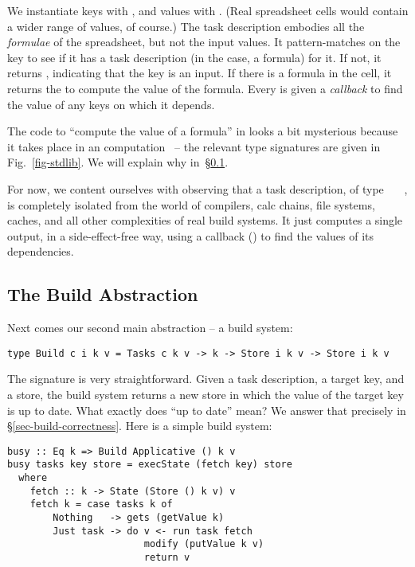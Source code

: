 \noindent
We instantiate keys  with , and values  with .
(Real spreadsheet cells would contain a wider range of values, of course.) The
task description  embodies all the \emph{formulae} of the spreadsheet,
but not the input values. It pattern-matches on the key to see if it has a task
description (in the \Excel case, a formula) for it. If not, it returns
, indicating that the key is an input. If there is a formula in the
cell, it returns the  to compute the value of the formula. Every
 is given a \emph{callback}  to find the value of any keys on
which it depends.

The code to ``compute the value of a formula'' in  looks a bit
mysterious because it takes place in an 
computation~\cite{mcbride2008applicative} -- the relevant type signatures are
given in Fig.~\ref{fig-stdlib}. We will explain why in~\S\ref{sec-general-build}.

For now, we content ourselves with observing that a task description, of type
~~~, is completely isolated from the world of
compilers, calc chains, file systems, caches, and all other complexities of real
build systems. It just computes a single output, in a side-effect-free way,
using a callback () to find the values of its dependencies.

\subsection{The Build Abstraction}\label{sec-general-build}

Next comes our second main abstraction -- a build system:

\vspace{1mm}
\begin{verbatim}
type Build c i k v = Tasks c k v -> k -> Store i k v -> Store i k v
\end{verbatim}
\vspace{1mm}

\noindent
The signature is very straightforward. Given a task description, a target key,
and a store, the build system returns a new store in which the value of the
target key is up to date. What exactly does ``up to date'' mean?  We answer
that precisely in \S\ref{sec-build-correctness}. Here is a simple build system:

\vspace{1mm}
\begin{verbatim}
busy :: Eq k => Build Applicative () k v
busy tasks key store = execState (fetch key) store
  where
    fetch :: k -> State (Store () k v) v
    fetch k = case tasks k of
        Nothing   -> gets (getValue k)
        Just task -> do v <- run task fetch
                        modify (putValue k v)
                        return v
\end{verbatim}
\vspace{1mm}

